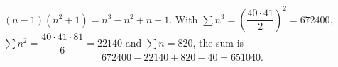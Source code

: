 $(n-1)\left(n^2+1\right)=n^3-n^2+n-1$. With $\sum n^3=\left(\dfrac{40\cdot41}{2}\right)^2=672400$, $\sum n^2=\dfrac{40\cdot41\cdot81}{6}=22140$ and $\sum n=820$, the sum is
\[672400-22140+820-40=\boxed{651040}.\]
